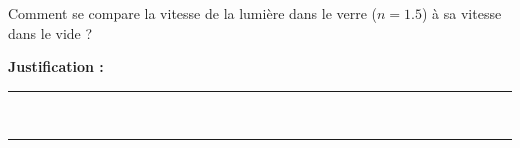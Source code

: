 Comment se compare la vitesse de la lumière dans le verre ($n = \num{1.5}$) à sa vitesse dans le vide ?

\choices

\noindent\textbf{Justification :} \hrulefill \\[2.5ex]
\rule{\linewidth}{0.4pt} \\[2.5ex]
\rule{\linewidth}{0.4pt}
\vfill
